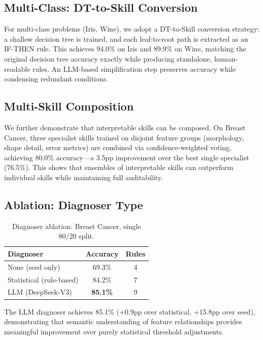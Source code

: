 \documentclass{article}
\begin{document}
\subsection{Multi-Class: DT-to-Skill Conversion}

For multi-class problems (Iris, Wine), we adopt a DT-to-Skill conversion strategy: a shallow decision tree is trained, and each leaf-to-root path is extracted as an IF-THEN rule. This achieves 94.0\% on Iris and 89.9\% on Wine, matching the original decision tree accuracy exactly while producing standalone, human-readable rules. An LLM-based simplification step preserves accuracy while condensing redundant conditions.

\subsection{Multi-Skill Composition}

We further demonstrate that interpretable skills can be composed. On Breast Cancer, three specialist skills trained on disjoint feature groups (morphology, shape detail, error metrics) are combined via confidence-weighted voting, achieving 80.0\% accuracy---a 3.5pp improvement over the best single specialist (76.5\%). This shows that ensembles of interpretable skills can outperform individual skills while maintaining full auditability.

\subsection{Ablation: Diagnoser Type}

\begin{table}[h]
\centering
\caption{Diagnoser ablation: Breast Cancer, single 80/20 split.}
\begin{tabular}{lcc}
\toprule
\textbf{Diagnoser} & \textbf{Accuracy} & \textbf{Rules} \\
\midrule
None (seed only) & 69.3\% & 4 \\
Statistical (rule-based) & 84.2\% & 7 \\
LLM (DeepSeek-V3) & \textbf{85.1\%} & 9 \\
\bottomrule
\end{tabular}
\end{table}

The LLM diagnoser achieves 85.1\% (+0.9pp over statistical, +15.8pp over seed), demonstrating that semantic understanding of feature relationships provides meaningful improvement over purely statistical threshold adjustments.
\end{document}
